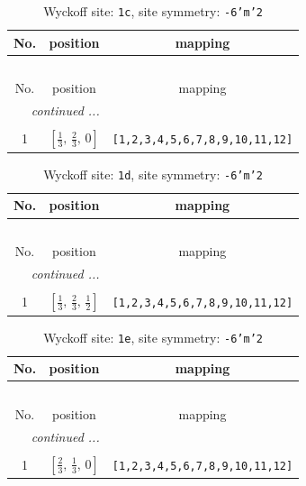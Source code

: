 \documentclass[fleqn,8pt]{jsarticle}
\begin{document}
\begin{longtable}{ccc}
\caption{Wyckoff site: {\tt 1c}, site symmetry: {\tt -6'm'2}}
 \\
 \hline \hline
No. & position & mapping \\ \hline \endfirsthead

\multicolumn{2}{l}{\tablename\ \thetable{}} \\
 \hline \hline
No. & position & mapping \\ \hline \endhead

 \hline \hline
\multicolumn{2}{r}{\footnotesize\it continued ...} \\ \endfoot

 \hline \hline
\multicolumn{2}{r}{} \\ \endlastfoot

1 & $\left[ \frac{1}{3},\, \frac{2}{3},\, 0 \right]$ & {\tt [1,2,3,4,5,6,7,8,9,10,11,12]} \\
\end{longtable}
\renewcommand{\arraystretch}{1.2}
\begin{longtable}{ccc}
\caption{Wyckoff site: {\tt 1d}, site symmetry: {\tt -6'm'2}}
 \\
 \hline \hline
No. & position & mapping \\ \hline \endfirsthead

\multicolumn{2}{l}{\tablename\ \thetable{}} \\
 \hline \hline
No. & position & mapping \\ \hline \endhead

 \hline \hline
\multicolumn{2}{r}{\footnotesize\it continued ...} \\ \endfoot

 \hline \hline
\multicolumn{2}{r}{} \\ \endlastfoot

1 & $\left[ \frac{1}{3},\, \frac{2}{3},\, \frac{1}{2} \right]$ & {\tt [1,2,3,4,5,6,7,8,9,10,11,12]} \\
\end{longtable}
\renewcommand{\arraystretch}{1.2}
\begin{longtable}{ccc}
\caption{Wyckoff site: {\tt 1e}, site symmetry: {\tt -6'm'2}}
 \\
 \hline \hline
No. & position & mapping \\ \hline \endfirsthead

\multicolumn{2}{l}{\tablename\ \thetable{}} \\
 \hline \hline
No. & position & mapping \\ \hline \endhead

 \hline \hline
\multicolumn{2}{r}{\footnotesize\it continued ...} \\ \endfoot

 \hline \hline
\multicolumn{2}{r}{} \\ \endlastfoot

1 & $\left[ \frac{2}{3},\, \frac{1}{3},\, 0 \right]$ & {\tt [1,2,3,4,5,6,7,8,9,10,11,12]} \\
\end{longtable}
\end{document}

